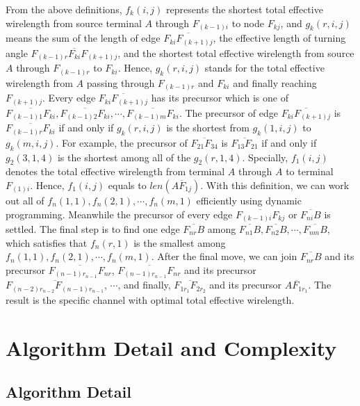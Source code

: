 \documentclass[journal]{IEEEtran}
\begin{document}
From the above definitions, $f_k(i, j)$ represents the shortest total effective wirelength from source terminal $A$ through $F_{(k-1)i}$ to node $F_{kj}$, and $g_k(r, i, j)$ means the sum of the length of edge $\overline{F_{ki}F_{(k+1)j}}$, the effective length of turning angle $\overline{F_{(k-1)r}F_{ki}F_{(k+1)j}}$, and the shortest total effective wirelength from source $A$ through $F_{(k-1)r}$ to $F_{ki}$. Hence, $g_k(r, i, j)$ stands for the total effective wirelength from $A$ passing through $F_{(k-1)r}$ and $F_{ki}$ and finally reaching $F_{(k+1)j}$. Every edge $\overline{F_{ki}F_{(k+1)j}}$ has its precursor which is one of $\overline{F_{(k-1)1}F_{ki}}, \overline{F_{(k-1)2}F_{ki}}, \cdots, \overline{F_{(k-1)m}F_{ki}}$. The precursor of edge $\overline{F_{ki}F_{(k+1)j}}$ is $\overline{F_{(k-1)r}F_{ki}}$ if and only if $g_k(r, i, j)$ is the shortest from $g_k(1, i, j)$ to $g_k(m, i, j)$. For example, the precursor of $\overline{F_{21}F_{34}}$ is $\overline{F_{13}F_{21}}$ if and only if $g_2(3, 1, 4)$ is the shortest among all of the $g_2(r, 1, 4)$. Specially, $f_1(i, j)$ denotes the total effective wirelength from terminal $A$ through $A$ to terminal $F_{(1)i}$. Hence, $f_1(i, j)$ equals to $len(\overline{AF_{1j}})$. With this definition, we can work out all of $f_n(1, 1), f_n(2, 1), \cdots, f_n(m, 1)$ efficiently using dynamic programming. 
Meanwhile the precursor of every edge $\overline{F_{(k-1)i}F_{kj}}$ or $\overline{F_{ni}B}$ is settled. The final step is to find one edge $\overline{F_{nr}B}$ among $\overline{F_{n1}B}, \overline{F_{n2}B}, \cdots, \overline{F_{nm}B}$, which satisfies that $f_n(r, 1)$ is the smallest among $f_n(1, 1), f_n(2, 1), \cdots, f_n(m, 1)$. After the final move, we can join $\overline{F_{nr}B}$ and its precursor $\overline{F_{(n-1)r_{n-1}}F_{nr}}$, $\overline{F_{(n-1)r_{n-1}}F_{nr}}$ and its precursor $\overline{F_{(n-2)r_{n-2}}F_{(n-1)r_{n-1}}}$, $\cdots$, and finally, $\overline{F_{1r_1}F_{2r_2}}$ and its precursor $\overline{AF_{1r_1}}$. The result is the specific channel with optimal total effective wirelength.

\section{Algorithm Detail and Complexity}
\label{sec:prca}

\subsection{Algorithm Detail}
\label{subsec:code}
\end{document}
